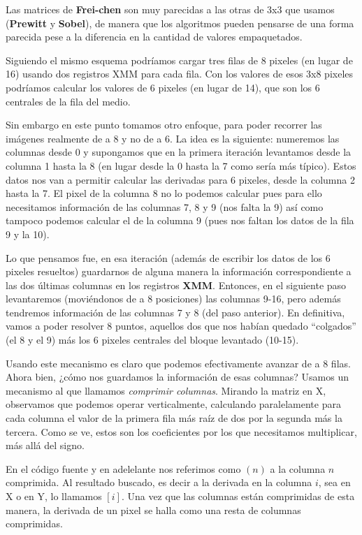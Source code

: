 Las matrices de \textbf{Frei-chen} son muy parecidas a las otras de 3x3 que 
usamos (\textbf{Prewitt} y \textbf{Sobel}), de manera que los algoritmos pueden
pensarse de una forma parecida pese a la diferencia en la cantidad de valores
empaquetados.

Siguiendo el mismo esquema podríamos cargar tres filas de 8 pixeles (en lugar de
16) usando dos registros XMM para cada fila. Con los valores de esos 3x8 pixeles
podríamos calcular los valores de 6 pixeles (en lugar de 14), que son los 6
centrales de la fila del medio.

Sin embargo en este punto tomamos otro enfoque, para poder recorrer las
imágenes realmente de a 8 y no de a 6. La idea es la siguiente: numeremos las 
columnas desde 0 y supongamos que en la primera iteración levantamos desde la
columna 1 hasta la 8 (en lugar desde la 0 hasta la 7 como sería más típico).
Estos datos nos van a permitir calcular las derivadas para 6 pixeles, desde la 
columna 2 hasta la 7. El pixel de la columna 8 no lo podemos calcular pues para
ello necesitamos información de las columnas 7, 8 y 9 (nos falta la 9) así como
tampoco podemos calcular el de la columna 9 (pues nos faltan los datos de la fila
9 y la 10).

Lo que pensamos fue, en esa iteración (además de escribir los datos de los 6 pixeles
resueltos) guardarnos de alguna manera la información correspondiente a las dos últimas
columnas en los registros \textbf{XMM}. Entonces, en el siguiente paso levantaremos
(moviéndonos de a 8 posiciones) las columnas 9-16, pero además tendremos información
de las columnas 7 y 8 (del paso anterior). En definitiva, vamos a poder resolver 8
puntos, aquellos dos que nos habían quedado ``colgados'' (el 8 y el 9) más los 6
pixeles centrales del bloque levantado (10-15).

Usando este mecanismo es claro que podemos efectivamente avanzar de a 8 filas. Ahora
bien, ¿cómo nos guardamos la información de esas columnas? Usamos un mecanismo al
que llamamos \emph{comprimir columnas}. Mirando la matriz en X, observamos que 
podemos operar verticalmente, calculando paralelamente para cada columna el valor de la primera
fila más raíz de dos por la segunda más la tercera. Como se ve, estos son los coeficientes
por los que necesitamos multiplicar, más allá del signo.

En el código fuente y en adelelante nos referimos como $(n)$ a la columna $n$ comprimida.
Al resultado buscado, es decir a la derivada en la columna $i$, sea en X o en Y,
lo llamamos $[i]$. Una vez que las columnas están comprimidas de esta manera, la derivada
de un pixel se halla como una resta de columnas comprimidas.

